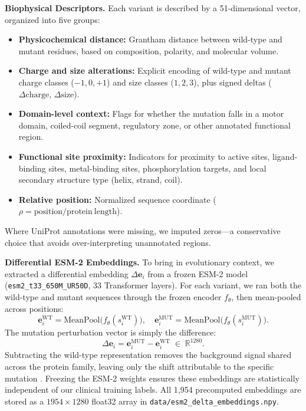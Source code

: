 \documentclass[conference]{IEEEtran}
\newcommand{\Deltaemb}{\Delta\mathbf{e}}
\begin{document}
\vspace{2mm}\noindent\textbf{Biophysical Descriptors.}
Each variant is described by a 51-dimensional vector, organized into five groups:
\begin{itemize}
    \item \textbf{Physicochemical distance:} Grantham distance between wild-type and mutant residues, based on composition, polarity, and molecular volume.
    \item \textbf{Charge and size alterations:} Explicit encoding of wild-type and mutant charge classes ($-1, 0, +1$) and size classes ($1, 2, 3$), plus signed deltas ($\Delta\mathrm{charge}$, $\Delta\mathrm{size}$).
    \item \textbf{Domain-level context:} Flags for whether the mutation falls in a motor domain, coiled-coil segment, regulatory zone, or other annotated functional region.
    \item \textbf{Functional site proximity:} Indicators for proximity to active sites, ligand-binding sites, metal-binding sites, phosphorylation targets, and local secondary structure type (helix, strand, coil).
    \item \textbf{Relative position:} Normalized sequence coordinate ($\rho = \mathrm{position} / \mathrm{protein\ length}$).
\end{itemize}

Where UniProt annotations were missing, we imputed zeros---a conservative choice that avoids over-interpreting unannotated regions.

\vspace{2mm}\noindent\textbf{Differential ESM-2 Embeddings.}
To bring in evolutionary context, we extracted a differential embedding $\Deltaemb_i$ from a frozen ESM-2 model \cite{lin2023esm2} (\texttt{esm2\_t33\_650M\_UR50D}, 33 Transformer layers). For each variant, we ran both the wild-type and mutant sequences through the frozen encoder $f_\theta$, then mean-pooled across positions:
\begin{equation}
  \mathbf{e}_i^{\mathrm{WT}}  = \mathrm{MeanPool}\bigl(f_\theta(s_i^{\mathrm{WT}})\bigr),\quad
  \mathbf{e}_i^{\mathrm{MUT}} = \mathrm{MeanPool}\bigl(f_\theta(s_i^{\mathrm{MUT}})\bigr).
\end{equation}
The mutation perturbation vector is simply the difference:
\begin{equation}
  \Deltaemb_i = \mathbf{e}_i^{\mathrm{MUT}} - \mathbf{e}_i^{\mathrm{WT}} \;\in\;\mathbb{R}^{1280}.
  \label{eq:delta_emb}
\end{equation}
Subtracting the wild-type representation removes the background signal shared across the protein family, leaving only the shift attributable to the specific mutation \cite{frazer2021eve}. Freezing the ESM-2 weights ensures these embeddings are statistically independent of our clinical training labels. All 1,954 precomputed embeddings are stored as a $1954 \times 1280$ float32 array in \texttt{data/esm2\_delta\_embeddings.npy}.
\end{document}
